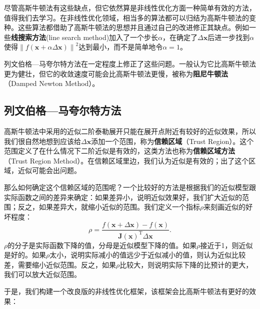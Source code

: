 尽管高斯牛顿法有这些缺点，但它依然算是非线性优化方面一种简单有效的方法，值得我们去学习。在非线性优化领域，相当多的算法都可以归结为高斯牛顿法的变种。这些算法都借助了高斯牛顿法的思想并且通过自己的改进修正其缺点。例如一些\textbf{线搜索方法}(line search method)加入了一个步长$\alpha$，在确定了$\Delta \bm{x}$后进一步找到$\alpha$使得$\left\| f(\bm{x} + \alpha \Delta \bm{ x}) \right\|^2$达到最小，而不是简单地令$\alpha = 1$。

列文伯格—马夸尔特方法在一定程度上修正了这些问题。一般认为它比高斯牛顿法更为健壮，但它的收敛速度可能会比高斯牛顿法更慢，被称为\textbf{阻尼牛顿法}（Damped Newton Method）。

\subsection{列文伯格—马夸尔特方法}
高斯牛顿法中采用的近似二阶泰勒展开只能在展开点附近有较好的近似效果，所以我们很自然地想到应该给$\Delta \bm{x}$添加一个范围，称为\textbf{信赖区域}（Trust Region）。这个范围定义了在什么情况下二阶近似是有效的，这类方法也称为\textbf{信赖区域方法}（Trust Region Method）。在信赖区域里边，我们认为近似是有效的；出了这个区域，近似可能会出问题。

那么如何确定这个信赖区域的范围呢？一个比较好的方法是根据我们的近似模型跟实际函数之间的差异来确定：如果差异小，说明近似效果好，我们扩大近似的范围；反之，如果差异大，就缩小近似的范围。我们定义一个指标$\rho$来刻画近似的好坏程度：
\begin{equation}\label{eq:6.24}
\rho  = \frac{{f\left( {\bm{x} + \Delta \bm{x}} \right)}  - {{ {f\left( \bm{x} \right)} }}}{ \bm{J}\left( \bm{x} \right)^\mathrm{T} \Delta \bm{x} } .
\end{equation}
$\rho$的分子是实际函数下降的值，分母是近似模型下降的值。如果$\rho$接近于1，则近似是好的。如果$\rho$太小，说明实际减小的值远少于近似减小的值，则认为近似比较差，需要缩小近似范围。反之，如果$\rho$比较大，则说明实际下降的比预计的更大，我们可以放大近似范围。

于是，我们构建一个改良版的非线性优化框架，该框架会比高斯牛顿法有更好的效果：

